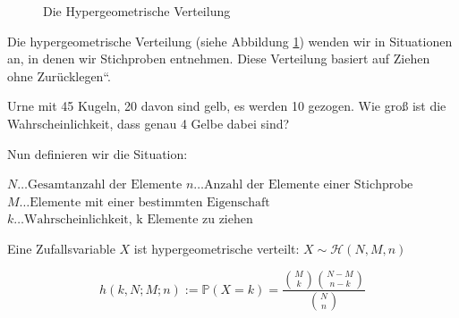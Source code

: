 {    {
        \begin{figure}
            \def\nval{20}
            \def\Nvala{30}
            \def\Mvala{20}
            \def\Nvalb{50}
            \def\Mvalb{20}
            \def\Nvalc{30}
            \def\Mvalc{10}
            \def\steps{20}

            \subfigure[Wahrscheinlichkeitsfunktion]{
                \begin{tikzpicture}
                                
                \end{tikzpicture}
                \label{fig:hyper_dist_a}
            }
           \caption{Die Hypergeometrische Verteilung}
           \label{fig:hyper_dist}
        \end{figure}
    }

    Die hypergeometrische Verteilung (siehe Abbildung \ref{fig:hyper_dist}) wenden wir in Situationen an, in denen
    wir Stichproben entnehmen. Diese Verteilung basiert auf
    {\quotedblbase}Ziehen ohne Zurücklegen{\textquotedblleft}. 
    \begin{bsp}
        Urne mit 45 Kugeln, 20 davon sind gelb, es werden 10 gezogen.
        Wie groß ist die Wahrscheinlichkeit, dass genau 4 Gelbe dabei sind?
    \end{bsp}
    Nun definieren wir die Situation:

    {\centering  $N\ldots \text{Gesamtanzahl~der~Elemente}$\newline
     $n\ldots \text{Anzahl~der~Elemente~einer~Stichprobe}$\newline
     $M\ldots \text{Elemente~mit~einer~bestimmten~Eigenschaft}$\newline
     $k\ldots \text{Wahrscheinlichkeit,~k~Elemente~zu~ziehen}$\par}

     \begin{definition}
         Eine Zufallsvariable $X$ ist hypergeometrische verteilt: $X\sim\mathcal H(N,M,n)$

         \[h\left(k,N;M;n\right):=\mathbb P\left(X=k\right)=
            \frac{\binom{M}{k}\binom{N-M}{n-k}}{\binom{N}{n}}\]
    \end{definition}

}
